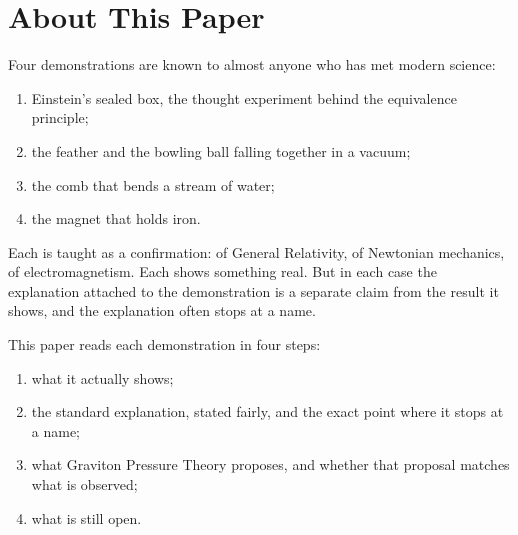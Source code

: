 \newcommand{\gptpart}{11}
\newcommand{\gpttitle}{Re-examining the Four}
\newcommand{\gptsubtitle}{Graviton Pressure Theory and the Return to Causal Physics}
\newcommand{\gptdate}{November 2026}

\usepackage{longtable,float,placeins}
\graphicspath{{figs/}}
\newcommand{\reg}[1]{\textsf{\small\textbf{[#1]}}}
\newcommand{\RN}{\reg{N}}
\newcommand{\RGR}{\reg{GR}}
\newcommand{\RFR}{\reg{FR}}
\newcommand{\RC}{\reg{C}}
\newcommand{\REN}{\reg{EN}}
\newcommand{\RQ}{\reg{Q}}
\newcommand{\RDS}{\reg{DS}}
\newcommand{\expl}[1]{\par\noindent\hspace*{1.2em}\begin{minipage}[t]{\dimexpr\linewidth-1.2em}\small\textit{Explained as:} #1\end{minipage}\par\smallskip}
\newcommand{\why}[1]{\par\textit{#1}\par}

\gptitle

\section*{About This Paper}

Four demonstrations are known to almost anyone who has met modern science:
\begin{enumerate}
    \item Einstein's sealed box, the thought experiment behind the equivalence principle;
    \item the feather and the bowling ball falling together in a vacuum;
    \item the comb that bends a stream of water;
    \item the magnet that holds iron.
\end{enumerate}

Each is taught as a confirmation: of General Relativity, of Newtonian mechanics, of electromagnetism. Each shows something real. But in each case the explanation attached to the demonstration is a separate claim from the result it shows, and the explanation often stops at a name.

This paper reads each demonstration in four steps:
\begin{enumerate}
    \item what it actually shows;
    \item the standard explanation, stated fairly, and the exact point where it stops at a name;
    \item what Graviton Pressure Theory proposes, and whether that proposal matches what is observed;
    \item what is still open.
\end{enumerate}

